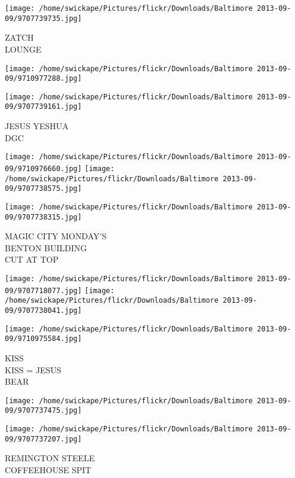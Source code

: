 \documentclass[10pt,letterpaper]{article}
\begin{document}
\vspace{0.25in}
\texttt{[image: /home/swickape/Pictures/flickr/Downloads/Baltimore 2013-09-09/9707739735.jpg]}

ZATCH\\
LOUNGE\\
\pagebreak

\texttt{[image: /home/swickape/Pictures/flickr/Downloads/Baltimore 2013-09-09/9710977288.jpg]}

\vspace{0.25in}
\texttt{[image: /home/swickape/Pictures/flickr/Downloads/Baltimore 2013-09-09/9707739161.jpg]}

JESUS YESHUA\\
DGC\\
\pagebreak

\texttt{[image: /home/swickape/Pictures/flickr/Downloads/Baltimore 2013-09-09/9710976660.jpg]}
\texttt{[image: /home/swickape/Pictures/flickr/Downloads/Baltimore 2013-09-09/9707738575.jpg]}

\vspace{0.25in}
\texttt{[image: /home/swickape/Pictures/flickr/Downloads/Baltimore 2013-09-09/9707738315.jpg]}

MAGIC CITY MONDAY'S\\
BENTON BUILDING\\
CUT AT TOP\\
\pagebreak

\texttt{[image: /home/swickape/Pictures/flickr/Downloads/Baltimore 2013-09-09/9707718077.jpg]}
\texttt{[image: /home/swickape/Pictures/flickr/Downloads/Baltimore 2013-09-09/9707738041.jpg]}

\texttt{[image: /home/swickape/Pictures/flickr/Downloads/Baltimore 2013-09-09/9710975584.jpg]}

KISS\\
KISS = JESUS\\
BEAR\\
\pagebreak

\texttt{[image: /home/swickape/Pictures/flickr/Downloads/Baltimore 2013-09-09/9707737475.jpg]}

\vspace{0.25in}
\texttt{[image: /home/swickape/Pictures/flickr/Downloads/Baltimore 2013-09-09/9707737207.jpg]}

REMINGTON STEELE\\
COFFEEHOUSE SPIT\\
\pagebreak
\end{document}
